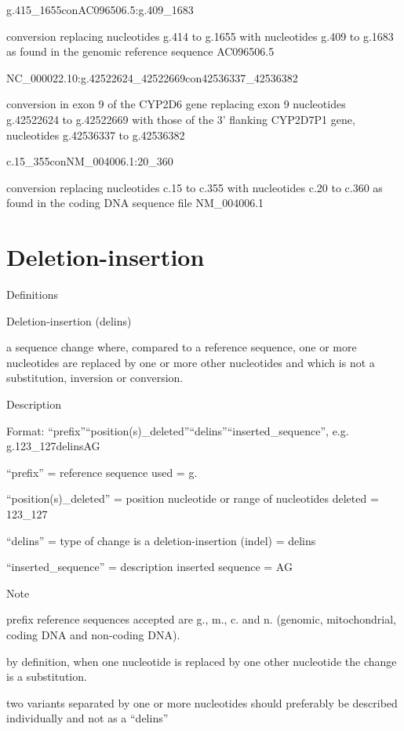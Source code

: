 \documentclass{book}
\begin{document}
	g.415\_1655conAC096506.5:g.409\_1683

	conversion replacing nucleotides g.414 to g.1655 with nucleotides g.409 to g.1683 as found in the genomic reference sequence AC096506.5

	NC\_000022.10:g.42522624\_42522669con42536337\_42536382

	conversion in exon 9 of the CYP2D6 gene replacing exon 9 nucleotides g.42522624 to g.42522669 with those of the 3’ flanking CYP2D7P1 gene, nucleotides g.42536337 to g.42536382

	c.15\_355conNM\_004006.1:20\_360

	conversion replacing nucleotides c.15 to c.355 with nucleotides c.20 to c.360 as found in the coding DNA sequence file NM\_004006.1

	

	\section{Deletion-insertion}

	

	Definitions

	Deletion-insertion (delins)

	a sequence change where, compared to a reference sequence, one or more nucleotides are replaced by one or more other nucleotides and which is not a substitution, inversion or conversion.

	

	

	Description

	Format: “prefix”“position(s)\_deleted”“delins”“inserted\_sequence”, e.g. g.123\_127delinsAG

	“prefix” = reference sequence used = g.

	“position(s)\_deleted” = position nucleotide or range of nucleotides deleted = 123\_127

	“delins” = type of change is a deletion-insertion (indel) = delins

	“inserted\_sequence” = description inserted sequence = AG

	

	Note

	prefix reference sequences accepted are g., m., c. and n. (genomic, mitochondrial, coding DNA and non-coding DNA).

	by definition, when one nucleotide is replaced by one other nucleotide the change is a substitution.

	two variants separated by one or more nucleotides should preferably be described individually and not as a “delins” 
\end{document}
